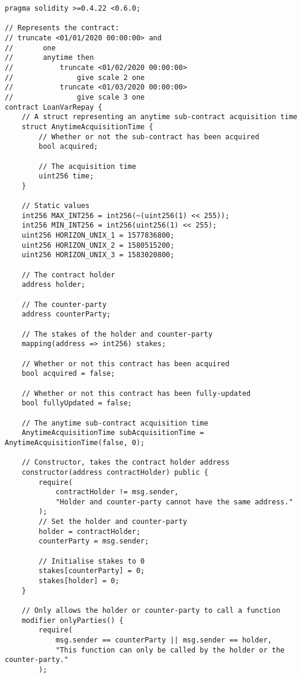 \begin{lstlisting}[language=Solidity, caption={A Solidity smart contract for the \textit{loan with variable repayment} contract case study in section \ref{case-studies}.}, captionpos=b, breaklines=true, postbreak=\mbox{\textcolor{red}{$\hookrightarrow$}\space}]
pragma solidity >=0.4.22 <0.6.0;

// Represents the contract:
// truncate <01/01/2020 00:00:00> and
//       one
//       anytime then
//           truncate <01/02/2020 00:00:00>
//               give scale 2 one
//           truncate <01/03/2020 00:00:00>
//               give scale 3 one
contract LoanVarRepay {
    // A struct representing an anytime sub-contract acquisition time
    struct AnytimeAcquisitionTime {
        // Whether or not the sub-contract has been acquired
        bool acquired;

        // The acquisition time
        uint256 time;
    }

    // Static values
    int256 MAX_INT256 = int256(~(uint256(1) << 255));
    int256 MIN_INT256 = int256(uint256(1) << 255);
    uint256 HORIZON_UNIX_1 = 1577836800;
    uint256 HORIZON_UNIX_2 = 1580515200;
    uint256 HORIZON_UNIX_3 = 1583020800;

    // The contract holder
    address holder;

    // The counter-party
    address counterParty;

    // The stakes of the holder and counter-party
    mapping(address => int256) stakes;

    // Whether or not this contract has been acquired
    bool acquired = false;

    // Whether or not this contract has been fully-updated
    bool fullyUpdated = false;

    // The anytime sub-contract acquisition time
    AnytimeAcquisitionTime subAcquisitionTime = AnytimeAcquisitionTime(false, 0);

    // Constructor, takes the contract holder address
    constructor(address contractHolder) public {
        require(
            contractHolder != msg.sender,
            "Holder and counter-party cannot have the same address."
        );
        // Set the holder and counter-party
        holder = contractHolder;
        counterParty = msg.sender;

        // Initialise stakes to 0
        stakes[counterParty] = 0;
        stakes[holder] = 0;
    }

    // Only allows the holder or counter-party to call a function
    modifier onlyParties() {
        require(
            msg.sender == counterParty || msg.sender == holder,
            "This function can only be called by the holder or the counter-party."
        );


\end{lstlisting}
